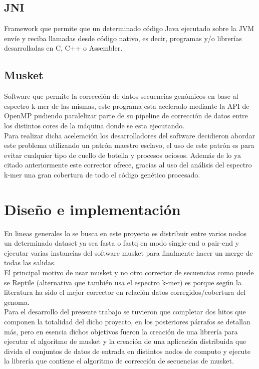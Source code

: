 \documentclass[conference]{IEEEtran}
\begin{document}
\subsection{JNI}
Framework que permite que un determinado código Java ejecutado sobre la JVM envíe y reciba llamadas desde código nativo, es decir, programas y/o librerías desarrolladas en C, C++ o Assembler.

\subsection{Musket}
Software que permite la corrección de datos secuencias genómicos en base al espectro k-mer de las mismas, este programa esta acelerado mediante la API de OpenMP pudiendo paralelizar parte de su pipeline de corrección de datos entre los distintos cores de la máquina donde se esta ejecutando.\\
Para realizar dicha aceleración los desarrolladores del software decidieron abordar este problema utilizando un patrón maestro esclavo, el uso de este patrón es para evitar cualquier tipo de cuello de botella y procesos ociosos. Además de lo ya citado anteriormente este corrector ofrece, gracias al uso del análisis del espectro k-mer una gran cobertura de todo el código genético procesado.

\section{Diseño e implementación}

En lineas generales lo se busca en este proyecto es distribuir entre varios nodos un determinado dataset ya sea fasta o fastq en modo single-end o pair-end y ejecutar varias instancias del software musket para finalmente hacer un merge de todas las salidas.\\
El principal motivo de usar musket y no otro corrector de secuencias como puede se Reptile (alternativa que también usa el espectro k-mer) es porque según la literatura ha sido el mejor corrector en relación datos corregidos/cobertura del genoma.\\

Para el desarrollo del presente trabajo se tuvieron que completar dos hitos que componen la totalidad del dicho proyecto, en los posteriores párrafos se detallan más, pero en esencia dichos objetivos fueron la creación de una librería para ejecutar el algoritmo de musket y la creación de una aplicación distribuida que divida el conjuntos de datos de entrada en distintos nodos de computo y ejecute la librería que contiene el algoritmo de corrección de secuencias de musket.
\end{document}
